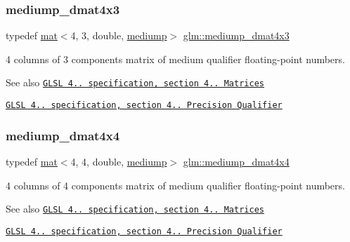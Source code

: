 \subsubsection{\texorpdfstring{mediump\+\_\+dmat4x3}{mediump\_dmat4x3}}
{\footnotesize\ttfamily typedef \mbox{\hyperlink{structglm_1_1mat}{mat}}$<$4, 3, double, \mbox{\hyperlink{namespaceglm_a36ed105b07c7746804d7fdc7cc90ff25a6416f3ea0c9025fb21ed50c4d6620482}{mediump}}$>$ \mbox{\hyperlink{group__core__precision_ga3c31b359e06498f36aae9bfde929a8ce}{glm\+::mediump\+\_\+dmat4x3}}}

4 columns of 3 components matrix of medium qualifier floating-\/point numbers.

\begin{DoxySeeAlso}{See also}
\href{http://www.opengl.org/registry/doc/GLSLangSpec.4.20.8.pdf}{\tt G\+L\+SL 4.. specification, section 4.. Matrices} 

\href{http://www.opengl.org/registry/doc/GLSLangSpec.4.20.8.pdf}{\tt G\+L\+SL 4.. specification, section 4.. Precision Qualifier} 
\end{DoxySeeAlso}
\mbox{\label{group__core__precision_ga53d2b544e1cf6812ed3b2f152d16a770}} 
\subsubsection{\texorpdfstring{mediump\+\_\+dmat4x4}{mediump\_dmat4x4}}
{\footnotesize\ttfamily typedef \mbox{\hyperlink{structglm_1_1mat}{mat}}$<$4, 4, double, \mbox{\hyperlink{namespaceglm_a36ed105b07c7746804d7fdc7cc90ff25a6416f3ea0c9025fb21ed50c4d6620482}{mediump}}$>$ \mbox{\hyperlink{group__core__precision_ga53d2b544e1cf6812ed3b2f152d16a770}{glm\+::mediump\+\_\+dmat4x4}}}

4 columns of 4 components matrix of medium qualifier floating-\/point numbers.

\begin{DoxySeeAlso}{See also}
\href{http://www.opengl.org/registry/doc/GLSLangSpec.4.20.8.pdf}{\tt G\+L\+SL 4.. specification, section 4.. Matrices} 

\href{http://www.opengl.org/registry/doc/GLSLangSpec.4.20.8.pdf}{\tt G\+L\+SL 4.. specification, section 4.. Precision Qualifier} 
\end{DoxySeeAlso}
\mbox{\label{group__core__precision_ga71307e1aa231cbc5d9de712a92714496}} 
